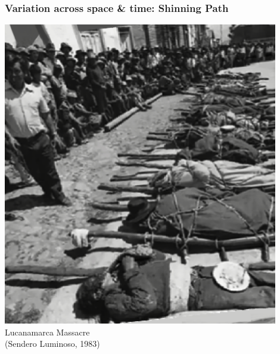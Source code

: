 \documentclass[aspectratio=43]{beamer}
\begin{document}
\begin{frame}
\frametitle{Variation across space \& time: Shinning Path}
\centering

\begin{minipage}{0.49\textwidth}\centering
\includegraphics[width = 0.9\textwidth]{img/lucanamarca}\\
{\small Lucanamarca Massacre\\(Sendero Luminoso, 1983)}\\
\end{minipage}\hfill
{}
\end{frame}
\end{document}
